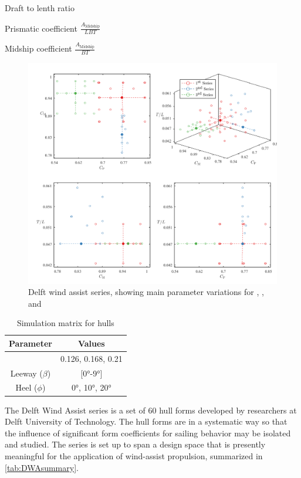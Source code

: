 \documentclass[twoside,twocolumn]{article}
\begin{document}
\begin{description}[leftmargin=1cm]

\item[\TL]{Draft to lenth ratio}
\item[\Cp]{Prismatic coefficient $\frac{A_{\mathrm{Midship}}}{LBT}$}
\item[\Cm]{Midship coefficient $\frac{A_{\mathrm{Midship}}}{BT}$}
\end{description}


\begin{figure}[!ht]
	\centering
	\includegraphics[width=.9\textwidth]{images/DWAseries.png}  %
	\caption{Delft wind assist series, showing main parameter variations for \TL, \Cp, and \Cm}
	\label{fig:DWA}
\end{figure}

\begin{table}[]
	\caption{Simulation matrix for \DWA hulls}
	\label{tab:parameters}
	\begin{tabular}{@{}cc@{}}
		\toprule
		\textbf{Parameter} & \textbf{Values} \\ \midrule
		\Fn & 0.126, 0.168, 0.21 \\
		Leeway ($\beta$) & [\ang{0}-\ang{9}] \\
		Heel ($\phi$) & \ang{0}, \ang{10}, \ang{20} \\ \bottomrule
	\end{tabular}
\end{table}

The Delft Wind Assist series is a set of 60 hull forms developed by researchers at Delft University of Technology. The hull forms are  in a systematic way so that the influence of significant form coefficients for sailing behavior may be isolated and studied. The series is set up to span a design space that is presently meaningful for the application of wind-assist propulsion, summarized in \cref{tab:DWAsummary}.
\end{document}
